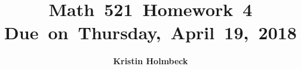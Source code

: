 


\newcommand{\hmwkTitle}{Homework\ 4} %
\newcommand{\hmwkDueDate}{Thursday,\ April\ 19,\ 2018} %
\newcommand{\hmwkClass}{Math\ 521} %
\newcommand{\hmwkAuthorName}{Kristin Holmbeck} %

\DeclareMathOperator*{\argmax}{arg\,max}
\DeclareMathOperator*{\argmin}{arg\,min}


\title{
\textmd{\textbf{\hmwkClass \ \hmwkTitle}}\\
\normalsize\vspace{0.1in}\small{Due\ on\ \hmwkDueDate}\\
\vspace{0.1in}
\vspace{0.2in}
}

\author{\textbf{\hmwkAuthorName}}
\date{} %




\maketitle


\vspace{0.75in}
\tableofcontents
\listoffigures
\newpage



